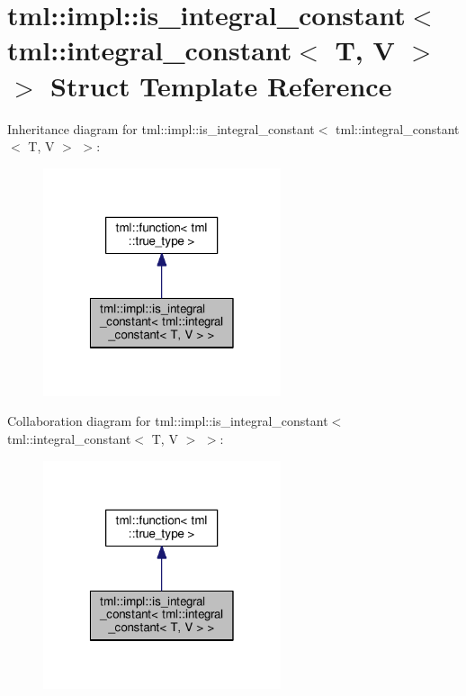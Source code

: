 \hypertarget{structtml_1_1impl_1_1is__integral__constant_3_01tml_1_1integral__constant_3_01_t_00_01_v_01_4_01_4}{\section{tml\+:\+:impl\+:\+:is\+\_\+integral\+\_\+constant$<$ tml\+:\+:integral\+\_\+constant$<$ T, V $>$ $>$ Struct Template Reference}
\label{structtml_1_1impl_1_1is__integral__constant_3_01tml_1_1integral__constant_3_01_t_00_01_v_01_4_01_4}
}


Inheritance diagram for tml\+:\+:impl\+:\+:is\+\_\+integral\+\_\+constant$<$ tml\+:\+:integral\+\_\+constant$<$ T, V $>$ $>$\+:
\nopagebreak
\begin{figure}[H]
\begin{center}
\leavevmode
\includegraphics[width=198pt]{structtml_1_1impl_1_1is__integral__constant_3_01tml_1_1integral__constant_3_01_t_00_01_v_01_4_01_4__inherit__graph}
\end{center}
\end{figure}


Collaboration diagram for tml\+:\+:impl\+:\+:is\+\_\+integral\+\_\+constant$<$ tml\+:\+:integral\+\_\+constant$<$ T, V $>$ $>$\+:
\nopagebreak
\begin{figure}[H]
\begin{center}
\leavevmode
\includegraphics[width=198pt]{structtml_1_1impl_1_1is__integral__constant_3_01tml_1_1integral__constant_3_01_t_00_01_v_01_4_01_4__coll__graph}
\end{center}
\end{figure}

